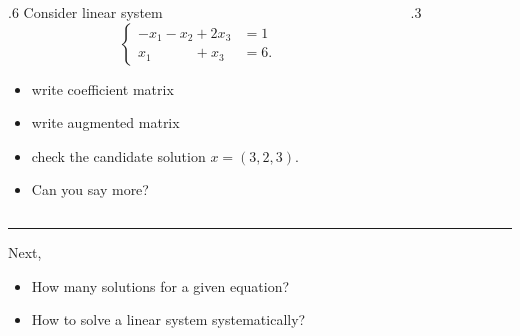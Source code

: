 \documentclass{beamer}
\theoremstyle{definition}
\theoremstyle{theorem}
\begin{document}
\begin{frame}
 {}
\begin{columns}
\begin{column}
 {.6\textwidth}
Consider linear system
$$
\left\{
\begin{array}
 {llllll}
   - x_{1} - x_{2} +2 x_{3} &= 1 \\
  x_{1} \quad\quad\quad +  x_{3} &= 6 .
\end{array}
\right.
$$

 \begin{itemize}
 \item  write coefficient matrix
 \item write augmented matrix
 \item check the candidate solution $x = (3, 2, 3)$.
 \item Can you say more?
\end{itemize}

\end{column}
\begin{column}
 {.3\textwidth}
% 
\end{column}
\end{columns}
\vspace{.2in}
\hrule
\vspace{.2in}
Next, 
\begin{itemize}
  \item How many solutions for a given equation?
 \item How to solve a linear system systematically?
\end{itemize}
\end{frame}
\end{document}
